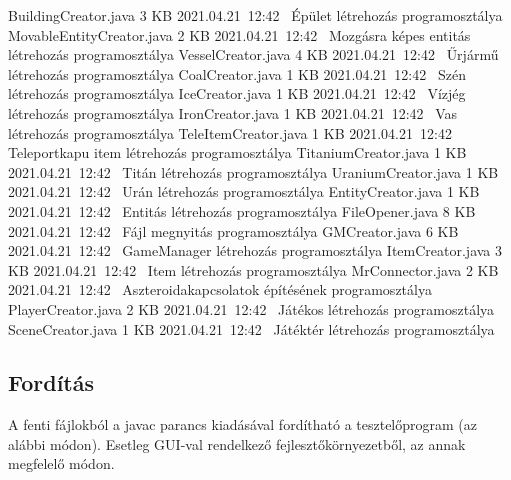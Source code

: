 \documentclass[../../projlab]{subfiles}
\begin{document}
\begin{fajllista}
	{BuildingCreator.java} %
    {3 KB} %
    {2021.04.21~12:42~} %
    {Épület létrehozás programosztálya} %
	\fajl
	{MovableEntityCreator.java} %
    {2 KB} %
    {2021.04.21~12:42~} %
    {Mozgásra képes entitás létrehozás programosztálya} %
	\fajl
	{VesselCreator.java} %
    {4 KB} %
    {2021.04.21~12:42~} %
    {Űrjármű létrehozás programosztálya} %
	\fajl
	{CoalCreator.java} %
    {1 KB} %
    {2021.04.21~12:42~} %
    {Szén létrehozás programosztálya} %
	\fajl
	{IceCreator.java} %
    {1 KB} %
    {2021.04.21~12:42~} %
    {Vízjég létrehozás programosztálya} %
	\fajl
	{IronCreator.java} %
    {1 KB} %
    {2021.04.21~12:42~} %
    {Vas létrehozás programosztálya} %
	\fajl
	{TeleItemCreator.java} %
    {1 KB} %
    {2021.04.21~12:42~} %
    {Teleportkapu item létrehozás programosztálya} %
	\fajl
	{TitaniumCreator.java} %
    {1 KB} %
    {2021.04.21~12:42~} %
    {Titán létrehozás programosztálya} %
	\fajl
	{UraniumCreator.java} %
    {1 KB} %
    {2021.04.21~12:42~} %
    {Urán létrehozás programosztálya} %
	\fajl
	{EntityCreator.java} %
    {1 KB} %
    {2021.04.21~12:42~} %
    {Entitás létrehozás programosztálya} %
	\fajl
	{FileOpener.java} %
    {8 KB} %
    {2021.04.21~12:42~} %
    {Fájl megnyitás programosztálya} %
	\fajl
	{GMCreator.java} %
    {6 KB} %
    {2021.04.21~12:42~} %
    {GameManager létrehozás programosztálya} %
	\fajl
	{ItemCreator.java} %
    {3 KB} %
    {2021.04.21~12:42~} %
    {Item létrehozás programosztálya} %
	\fajl
	{MrConnector.java} %
    {2 KB} %
    {2021.04.21~12:42~} %
    {Aszteroidakapcsolatok építésének programosztálya} %
	\fajl
	{PlayerCreator.java} %
    {2 KB} %
    {2021.04.21~12:42~} %
    {Játékos létrehozás programosztálya} %
	\fajl
	{SceneCreator.java} %
    {1 KB} %
    {2021.04.21~12:42~} %
    {Játéktér létrehozás programosztálya} %
\end{fajllista}

\subsection{Fordítás}
A fenti fájlokból a javac parancs kiadásával fordítható a tesztelőprogram (az alábbi módon).
Esetleg GUI-val rendelkező fejlesztőkörnyezetből, az annak megfelelő módon.
\end{document}
